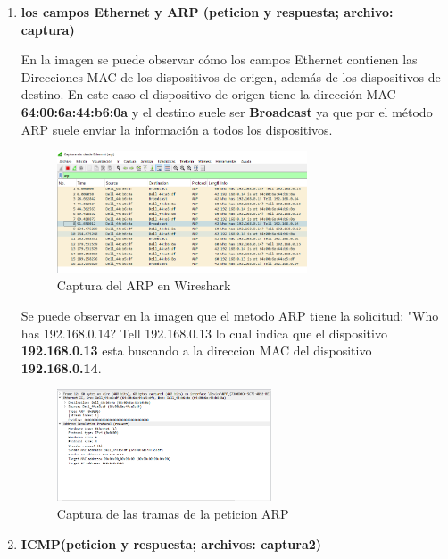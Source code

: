         \begin{enumerate}
            \item \textbf{los campos Ethernet y ARP (peticion y respuesta; archivo: captura)}
            
            En la imagen se puede observar cómo los campos Ethernet contienen las Direcciones MAC de los dispositivos de origen, además de los dispositivos de destino. En este caso el dispositivo de origen tiene la dirección MAC \textbf{64:00:6a:44:b6:0a} y el destino suele ser \textbf{Broadcast} ya que por el método ARP suele enviar la información a todos los dispositivos.
            \begin{figure}[H]
                \centering
                \includegraphics[width=0.7\textwidth]{img/ARP.PNG}
                \caption{Captura del ARP en Wireshark}
                \label{fig:ARP}
            \end{figure}

            Se puede observar en la imagen que el metodo ARP tiene la solicitud: "Who has 192.168.0.14? Tell 192.168.0.13 lo cual indica que el dispositivo \textbf{192.168.0.13} esta buscando a la direccion MAC del dispositivo \textbf{192.168.0.14}.
            \begin{figure}[H]
                \centering
                \includegraphics[width=0.6\textwidth]{img/PeticionARP.PNG}
                \caption{Captura de las tramas de la peticion ARP}
                \label{fig:peticionARP}
            \end{figure}
            \item \textbf{ICMP(peticion y respuesta; archivos: captura2)}
            

\end{enumerate}
